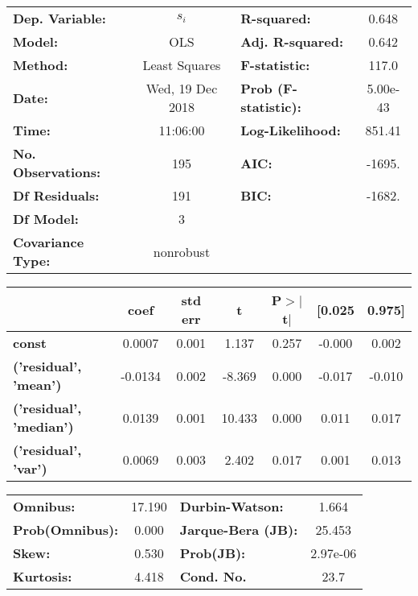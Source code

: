 \begin{center}
\begin{tabular}{lclc}
\toprule
\textbf{Dep. Variable:}    &      $s_i$       & \textbf{  R-squared:         } &    0.648  \\
\textbf{Model:}            &       OLS        & \textbf{  Adj. R-squared:    } &    0.642  \\
\textbf{Method:}           &  Least Squares   & \textbf{  F-statistic:       } &    117.0  \\
\textbf{Date:}             & Wed, 19 Dec 2018 & \textbf{  Prob (F-statistic):} & 5.00e-43  \\
\textbf{Time:}             &     11:06:00     & \textbf{  Log-Likelihood:    } &   851.41  \\
\textbf{No. Observations:} &         195      & \textbf{  AIC:               } &   -1695.  \\
\textbf{Df Residuals:}     &         191      & \textbf{  BIC:               } &   -1682.  \\
\textbf{Df Model:}         &           3      & \textbf{                     } &           \\
\textbf{Covariance Type:}  &    nonrobust     & \textbf{                     } &           \\
\bottomrule
\end{tabular}
\end{center}\begin{center}
\begin{tabular}{lcccccc}
\toprule
                                & \textbf{coef} & \textbf{std err} & \textbf{t} & \textbf{P$>$$|$t$|$} & \textbf{[0.025} & \textbf{0.975]}  \\
\midrule
\textbf{const}                  &       0.0007  &        0.001     &     1.137  &         0.257        &       -0.000    &        0.002     \\
\textbf{('residual', 'mean')}   &      -0.0134  &        0.002     &    -8.369  &         0.000        &       -0.017    &       -0.010     \\
\textbf{('residual', 'median')} &       0.0139  &        0.001     &    10.433  &         0.000        &        0.011    &        0.017     \\
\textbf{('residual', 'var')}    &       0.0069  &        0.003     &     2.402  &         0.017        &        0.001    &        0.013     \\
\bottomrule
\end{tabular}
\end{center}\begin{center}
\begin{tabular}{lclc}
\toprule
\textbf{Omnibus:}       & 17.190 & \textbf{  Durbin-Watson:     } &    1.664  \\
\textbf{Prob(Omnibus):} &  0.000 & \textbf{  Jarque-Bera (JB):  } &   25.453  \\
\textbf{Skew:}          &  0.530 & \textbf{  Prob(JB):          } & 2.97e-06  \\
\textbf{Kurtosis:}      &  4.418 & \textbf{  Cond. No.          } &     23.7  \\
\bottomrule
\end{tabular}
\end{center}